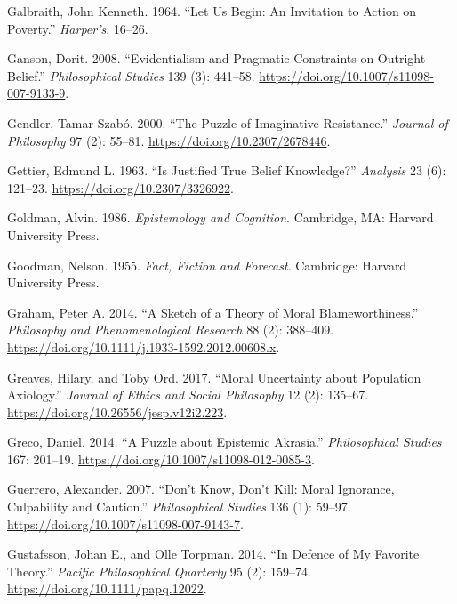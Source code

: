 \documentclass[
  10pt,
  letterpaper,
  twoside]{scrbook}
\newlength{\cslhangindent}
\newenvironment{CSLReferences}[2] %
 {\begin{list}{}{%
  \setlength{\itemindent}{0pt}
  \setlength{\leftmargin}{0pt}
  \setlength{\parsep}{0pt}
  \ifodd #1
   \setlength{\leftmargin}{\cslhangindent}
   \setlength{\itemindent}{-1\cslhangindent}
  \fi
  \setlength{\itemsep}{#2\baselineskip}}}
 {\end{list}}
\begin{document}
\begin{CSLReferences}{1}{0}
Galbraith, John Kenneth. 1964. {``Let Us Begin: An Invitation to Action
on Poverty.''} \emph{Harper's}, 16--26.

Ganson, Dorit. 2008. {``Evidentialism and Pragmatic Constraints on
Outright Belief.''} \emph{Philosophical Studies} 139 (3): 441--58.
\url{https://doi.org/10.1007/s11098-007-9133-9}.

Gendler, Tamar Szabó. 2000. {``The Puzzle of Imaginative Resistance.''}
\emph{Journal of Philosophy} 97 (2): 55--81.
\url{https://doi.org/10.2307/2678446}.

Gettier, Edmund L. 1963. {``Is Justified True Belief Knowledge?''}
\emph{Analysis} 23 (6): 121--23. \url{https://doi.org/10.2307/3326922}.

Goldman, Alvin. 1986. \emph{Epistemology and Cognition}. Cambridge, MA:
Harvard University Press.

Goodman, Nelson. 1955. \emph{Fact, Fiction and Forecast}. Cambridge:
Harvard University Press.

Graham, Peter A. 2014. {``A Sketch of a Theory of Moral
Blameworthiness.''} \emph{Philosophy and Phenomenological Research} 88
(2): 388--409. \url{https://doi.org/10.1111/j.1933-1592.2012.00608.x}.

Greaves, Hilary, and Toby Ord. 2017. {``Moral Uncertainty about
Population Axiology.''} \emph{Journal of Ethics and Social Philosophy}
12 (2): 135--67. \url{https://doi.org/10.26556/jesp.v12i2.223}.

Greco, Daniel. 2014. {``A Puzzle about Epistemic Akrasia.''}
\emph{Philosophical Studies} 167: 201--19.
\url{https://doi.org/10.1007/s11098-012-0085-3}.

Guerrero, Alexander. 2007. {``Don't Know, Don't Kill: Moral Ignorance,
Culpability and Caution.''} \emph{Philosophical Studies} 136 (1):
59--97. \url{https://doi.org/10.1007/s11098-007-9143-7}.

Gustafsson, Johan E., and Olle Torpman. 2014. {``In Defence of My
Favorite Theory.''} \emph{Pacific Philosophical Quarterly} 95 (2):
159--74. \url{https://doi.org/10.1111/papq.12022}.


\end{CSLReferences}
\end{document}

